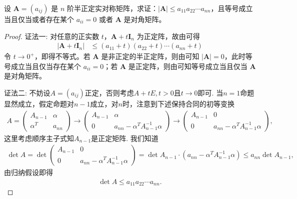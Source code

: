 \documentclass[../../main.tex]{subfiles}%
\begin{document}
\begin{proposition}\label{proposition:半正定阵行列式与主对角乘积的不等式}
设 \(\boldsymbol{A}=(a_{ij})\) 是 \(n\) 阶半正定实对称矩阵，求证：\(|\boldsymbol{A}|\leqslant  a_{11}a_{22}\cdots a_{nn}\)，且等号成立当且仅当或者存在某个 \(a_{ii}=0\) 或者 \(\boldsymbol{A}\) 是对角矩阵。 
\end{proposition}
\begin{proof}

{\color{blue}证法一:}
对任意的正实数 \(t\)，\(\boldsymbol{A}+t\boldsymbol{I}_n\) 为正定阵，故由可得
\begin{align*}
|\boldsymbol{A}+t\boldsymbol{I}_n|&\leqslant (a_{11}+t)(a_{22}+t)\cdots(a_{nn}+t)
\end{align*}
令 \(t\to0^+\)，即得不等式。若 \(\boldsymbol{A}\) 是非正定的半正定阵，则由可知 \(|\boldsymbol{A}| = 0\)，此时等号成立当且仅当存在某个 \(a_{ii}=0\)；若 \(\boldsymbol{A}\) 是正定阵，则由可知等号成立当且仅当 \(\boldsymbol{A}\) 是对角矩阵。

{\color{blue}证法二:}
不妨设$A=(a_{ij})$正定，否则考虑$A+tE,t>0$且$t \to 0$即可.
当$n=1$命题显然成立，假定命题对$n-1$成立，对$n$时，注意到下述保持合同的初等变换
\begin{align*}
A=\begin{pmatrix} A_{n-1} & \alpha \\ \alpha^T & a_{nn} \end{pmatrix} \to \begin{pmatrix} A_{n-1} & \alpha \\ 0 & a_{nn}-\alpha^T A_{n-1}^{-1}\alpha \end{pmatrix} \to \begin{pmatrix} A_{n-1} & 0 \\ 0 & a_{nn}-\alpha^T A_{n-1}^{-1}\alpha \end{pmatrix},
\end{align*}
这里考虑顺序主子式知$A_{n-1}$是正定矩阵. 我们知道
\begin{align*}
\det A = \det\begin{pmatrix} A_{n-1} & 0 \\ 0 & a_{nn}-\alpha^T A_{n-1}^{-1}\alpha \end{pmatrix} = \det A_{n-1} \cdot (a_{nn}-\alpha^T A_{n-1}^{-1}\alpha) \leqslant a_{nn} \det A_{n-1},
\end{align*}
由归纳假设即得
\begin{align*}
\det A \leqslant a_{11}a_{22}\cdots a_{nn}.
\end{align*}
\end{proof}
\end{document}
